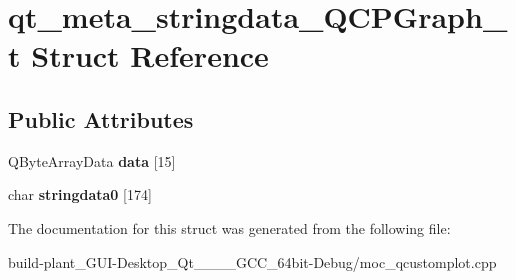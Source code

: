 \hypertarget{structqt__meta__stringdata__QCPGraph__t}{}\section{qt\+\_\+meta\+\_\+stringdata\+\_\+\+Q\+C\+P\+Graph\+\_\+t Struct Reference}
\label{structqt__meta__stringdata__QCPGraph__t}
\subsection*{Public Attributes}
\begin{DoxyCompactItemize}
\item 
\mbox{\label{structqt__meta__stringdata__QCPGraph__t_a070d55ece907072898e987f8594e5776}} 
Q\+Byte\+Array\+Data {\bfseries data} \mbox{[}15\mbox{]}
\item 
\mbox{\label{structqt__meta__stringdata__QCPGraph__t_a50b082c96ddea75773a05144ba6d44ca}} 
char {\bfseries stringdata0} \mbox{[}174\mbox{]}
\end{DoxyCompactItemize}


The documentation for this struct was generated from the following file\+:\begin{DoxyCompactItemize}
\item 
build-\/plant\+\_\+\+G\+U\+I-\/\+Desktop\+\_\+\+Qt\+\_\+\_\+\_\+\_\+\+G\+C\+C\+\_\+64bit-\/\+Debug/moc\+\_\+qcustomplot.\+cpp\end{DoxyCompactItemize}
